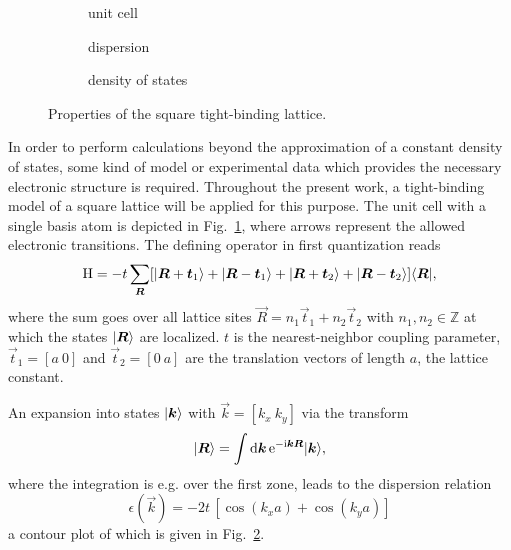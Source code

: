 \begin{figure}
    \small
    \begin{subfigure}[b]{4.666cm}
        \centering
        
        \caption{unit cell}
        \label{square-lattice unit cell}
    \end{subfigure}%
    \begin{subfigure}[b]{4.666cm}
        
        \caption{dispersion}
        \label{square-lattice dispersion}
    \end{subfigure}%
    \begin{subfigure}[b]{4.666cm}
        
        \caption{density of states}
        \label{square-lattice dos}
    \end{subfigure}
    \caption[Square lattice]
        {Properties of the square tight-binding lattice.}
\end{figure}
%
In order to perform calculations beyond the approximation of a constant density
of states, some kind of model or experimental data which provides the necessary
electronic structure is required. Throughout the present work, a tight-binding
model of a square lattice will be applied for this purpose. The unit cell with a
single basis atom is depicted in Fig.~\ref{square-lattice unit cell}, where
arrows represent the allowed electronic transitions. The defining
 operator in first quantization reads
%
\begin{equation*}
    \mathrm H = -t \sum_{\boldsymbol R}
         [ |\boldsymbol R + \boldsymbol t_1\rangle
         + |\boldsymbol R - \boldsymbol t_1\rangle
         + |\boldsymbol R + \boldsymbol t_2\rangle
         + |\boldsymbol R - \boldsymbol t_2\rangle ]
    \langle\boldsymbol R|,
\end{equation*}
%
where the sum goes over all lattice sites $\vec R = n_1 \vec t_1 + n_2 \vec t_2$
with $n_1, n_2 \in \mathds Z$ at which the  states $|\boldsymbol R\rangle$
are localized. $t$ is the nearest-neighbor coupling parameter, $\vec t_1 = [a \
0]$ and $\vec t_2 = [0 \ a]$ are the translation vectors of length $a$, the
lattice constant.

An expansion into  states $|\boldsymbol k\rangle$ with $\vec k = [k_x \ k_y]$
via the \name{Fourier} transform
%
\begin{equation*}
    |\boldsymbol R\rangle = \int \mathrm d \boldsymbol k \, \mathrm e^{-\mathrm i \boldsymbol k \boldsymbol R} |\boldsymbol k\rangle,
\end{equation*}
%
where the integration is e.g. over the first  zone, leads to the
dispersion relation
%
\begin{equation*}
    \epsilon(\vec k) = -2 t \, [\cos(k_x a) + \cos(k_y a)]
\end{equation*}
%
a contour plot of which is given in Fig.~\ref{square-lattice dispersion}.

